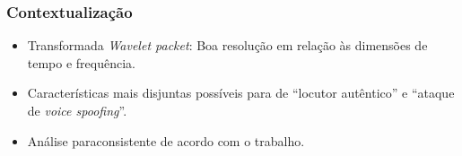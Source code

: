 \begin{frame}
	\frametitle{Contextualização}
	\begin{itemize}
		\item Transformada \textit{Wavelet packet}: Boa resolução em relação às dimensões de tempo e frequência.
		\item Características mais disjuntas possíveis para de ``locutor autêntico'' e ``ataque de \textit{voice spoofing}''.
		\item Análise paraconsistente de acordo com o trabalho.
	\end{itemize}
\end{frame}